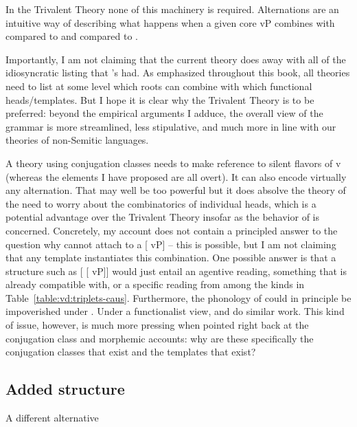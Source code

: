 \begin{exe}
\begin{xlist}
\begin{xlist}
\begin{exe}
\begin{exe}
\begin{xlist}
\begin{exe}
\begin{xlist}
\begin{exe}
\begin{xlist}
\begin{xlist}
\begin{exe}
\begin{xlist}
\begin{exe}
\begin{xlist}
\begin{exe}
\begin{exe}
\begin{exe}
\begin{xlist}
\begin{exe}
\begin{exe}
\begin{xlist}
\begin{xlist}
\begin{exe}
\begin{xlist}
\begin{exe}
\begin{exe}
\begin{exe}
\begin{xlist}
\begin{exe}
\begin{exe}
\begin{xlist}
\begin{exe}
\begin{xlist}
\begin{exe}
\begin{xlist}
\begin{exe}
\begin{xlist}
\begin{exe}
\begin{exe}
\begin{xlist}
\begin{exe}
\begin{exe}
\begin{xlist}
\begin{xlist}
\begin{exe}
\begin{xlist}
\begin{xlist}
\begin{exe}
\begin{xlist}
\begin{exe}
\begin{xlist}
\begin{exe}
\begin{xlist}
\begin{exe}
\begin{xlist}
\begin{exe}
\begin{exe}
\begin{exe}
\begin{exe}
\begin{xlist}
\begin{exe}
\begin{exe}
\begin{xlist}
\begin{xlist}
\begin{exe}
\begin{exe}
\begin{xlist}
\begin{exe}
\begin{xlist}
In the Trivalent Theory none of this machinery is required. Alternations are an intuitive way of describing what happens when a given core vP combines with  compared to {\vz} and compared to {\vd}.

Importantly, I am not claiming that the current theory does away with all of the idiosyncratic listing that \citeauthor{arad05}'s had. As emphasized throughout this book, all theories need to list at some level which roots can combine with which functional heads/templates. But I hope it is clear why the Trivalent Theory is to be preferred: beyond the empirical arguments I adduce, the overall view of the grammar is more streamlined, less stipulative, and much more in line with our theories of non-Semitic languages.

A theory using conjugation classes needs to make reference to silent flavors of v (whereas the elements I have proposed are all overt). It can also encode virtually any alternation. That may well be too powerful but it does absolve the theory of the need to worry about the combinatorics of individual heads, which is a potential advantage over the Trivalent Theory insofar as the behavior of {\vd} is concerned. Concretely, my account does not contain a principled answer to the question why {\vd} cannot attach to a [{\va} vP] -- this is possible, but I am not claiming that any template instantiates this combination. One possible answer is that a structure such as [{\vd} [{\va} vP]] would just entail an agentive reading, something that {\vd} is already compatible with, or a specific  reading from among the kinds in Table~\ref{table:vd:triplets-caus}. Furthermore, the phonology of {\va} could in principle be impoverished under {\vd}. Under a functionalist view, {\va} and {\vd} do similar work. This kind of issue, however, is much more pressing when pointed right back at the conjugation class and morphemic accounts: why are these specifically the conjugation classes that exist and the templates that exist?

	\subsection{Added structure} \label{vd:others:struct}
A different alternative 
\end{xlist}
\end{exe}
\end{xlist}
\end{exe}
\end{exe}
\end{xlist}
\end{xlist}
\end{exe}
\end{exe}
\end{xlist}
\end{exe}
\end{exe}
\end{exe}
\end{exe}
\end{xlist}
\end{exe}
\end{xlist}
\end{exe}
\end{xlist}
\end{exe}
\end{xlist}
\end{exe}
\end{xlist}
\end{xlist}
\end{exe}
\end{xlist}
\end{xlist}
\end{exe}
\end{exe}
\end{xlist}
\end{exe}
\end{exe}
\end{xlist}
\end{exe}
\end{xlist}
\end{exe}
\end{xlist}
\end{exe}
\end{xlist}
\end{exe}
\end{exe}
\end{xlist}
\end{exe}
\end{exe}
\end{exe}
\end{xlist}
\end{exe}
\end{xlist}
\end{xlist}
\end{exe}
\end{exe}
\end{xlist}
\end{exe}
\end{exe}
\end{exe}
\end{xlist}
\end{exe}
\end{xlist}
\end{exe}
\end{xlist}
\end{xlist}
\end{exe}
\end{xlist}
\end{exe}
\end{xlist}
\end{exe}
\end{exe}
\end{xlist}
\end{xlist}
\end{exe}

